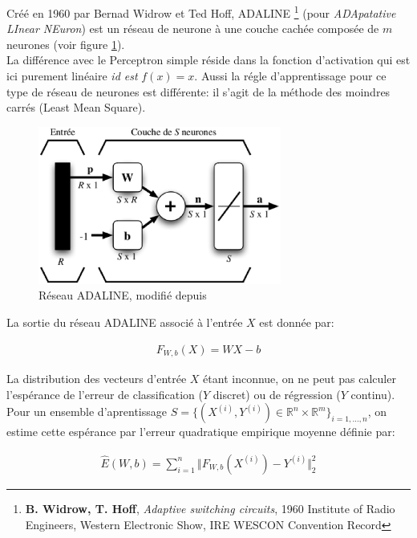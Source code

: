 Créé en 1960 par Bernad Widrow et Ted Hoff, ADALINE
\cite{adaline}\footnote{\textbf{B. Widrow, T. Hoff}, \textit{Adaptive switching
circuits}, 1960 Institute of Radio Engineers, Western Electronic Show, IRE
WESCON Convention Record} (pour \textit{ADApatative LInear NEuron}) est un
réseau de neurone à une couche cachée composée de $m$ neurones (voir figure
\ref{fig:adaline}).  \\

La différence avec le Perceptron simple réside dans la fonction d'activation
qui est ici purement linéaire \textit{id est} $f(x)=x$. Aussi la régle
d'apprentissage pour ce type de réseau de neurones est différente: il s'agit de
la méthode des moindres carrés (Least Mean Square).

\begin{figure}[!h]
\begin{center}
\includegraphics[width=8cm]{predoc/images/adaline.eps}
\end{center}
\caption{\label{fig:adaline} Réseau ADALINE, modifié depuis \cite{parizeau}}
\end{figure} 

La sortie du réseau ADALINE associé à l'entrée $X$ est donnée par:

\begin{eqnarray}
F_{W,b}(X) =  WX -b
\end{eqnarray}

La distribution des vecteurs d'entrée $X$ étant inconnue, on ne peut pas
calculer l'espérance de l'erreur de classification ($Y$ discret) ou de
régression ($Y$ continu). Pour un ensemble d'aprentissage
$S=\lbrace(X^{(i)},Y^{(i)})\in\mathbb{R}^{n}\times\mathbb{R}^{m}\rbrace_{i=1,\dots
,n}$, on estime cette espérance par l'erreur quadratique empirique moyenne
définie par:

\begin{eqnarray}
\hat{E}(W,b)=\sum_{i=1}^{n}\Vert F_{W,b}(X^{(i)})-Y^{(i)}\Vert^{2}_{2}
\end{eqnarray}

